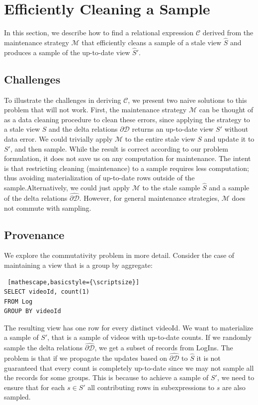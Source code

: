\section{Efficiently Cleaning a Sample} \label{sampling}
In this section, we describe how to find a relational expression $\mathcal{C}$ derived from the maintenance strategy $\mathcal{M}$ that
efficiently cleans a sample of a stale view $\widehat{S}$ and produces a sample of the up-to-date view $\widehat{S}'$.

\subsection{Challenges}
To illustrate the challenges in deriving $\mathcal{C}$, we present two naive solutions to this problem that will not work. 
First, the maintenance strategy $\mathcal{M}$ can be thought of as a data cleaning procedure to clean these errors, since applying the strategy to a stale view $S$ and the delta relations $\partial \mathcal{D}$ returns an up-to-date view $S'$ without data error.
We could trivially apply $\mathcal{M}$ to the entire stale view $S$ and update it to $S'$, and then sample.
While the result is correct according to our problem formulation, it does not save us on any computation for maintenance.
The intent is that restricting cleaning (maintenance) to a sample requires less computation; thus avoiding materialization of up-to-date rows outside of the sample.Alternatively, we could just apply $\mathcal{M}$ to the stale sample $\widehat{S}$ and a sample of the delta relations $\widehat{\partial \mathcal{D}}$. 
However, for general maintenance strategies, $\mathcal{M}$ does not commute with sampling. 

\subsection{Provenance}
\label{lin}
We explore the commutativity problem in more detail.
Consider the case of maintaining a view that is a group by aggregate:
\begin{lstlisting} [mathescape,basicstyle={\scriptsize}]
SELECT videoId, count(1) 
FROM Log
GROUP BY videoId
\end{lstlisting}
The resulting view has one row for every distinct videoId.
We want to materialize a sample of $S'$, that is a sample of videos with up-to-date counts.
If we randomly sample the delta relations $\widehat{\partial \mathcal{D}}$, we get a subset of records from LogIns.
The problem is that if we propagate the updates based on $\widehat{\partial \mathcal{D}}$ to $\widehat{S}$ it is not guaranteed that 
every count is completely up-to-date since we may not sample all the records for some groups.
This is because to achieve a sample of $S'$, we need to ensure that for each $s \in S'$ all contributing rows in subexpressions to $s$ are also sampled. 

